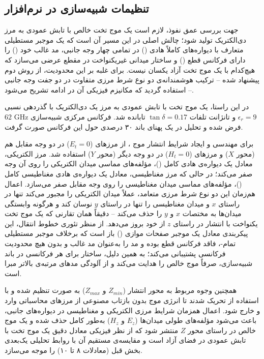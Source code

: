 \documentclass{article}
\begin{document}
	\subsection{تنظیمات شبیه‌سازی در نرم‌افزار }
	جهت بررسی عمق نفوذ، لازم است یک موج تخت  خالص با تابش عمودی به مرز دی‌الکتریک تولید شود؛ چالش اصلی در این مسیر آن است که یک موجبر مستطیلی متعارف با دیواره‌های کاملاً هادی () در تمامی چهار وجه جانبی، مد غالب خود () را دارای فرکانس قطع () و ساختار میدانی غیریکنواخت در مقطع عرضی می‌سازد که هیچ‌کدام با یک موج تخت آزاد یکسان نیست. برای غلبه بر این محدودیت، از روش دوم پیشنهاد شده -- ترکیب هوشمندانه‌ی دو نوع شرط مرزی متفاوت در دو جفت وجه جانبی -- استفاده گردید که مکانیزم فیزیکی آن در ادامه تشریح می‌شود.
	
	در این راستا، یک موج تخت با تابش عمودی به مرز یک دی‌الکتریک با گذردهی نسبی $\epsilon_r = 9$ و تانژانت تلفات $\tan\delta = 0.17$ تابانده شد. فرکانس مرکزی شبیه‌سازی $62 \text{ GHz}$ فرض شده و تحلیل در یک پهنای باند ۳۰ درصدی حول این فرکانس صورت گرفت.
	
	برای مهندسی و ایجاد شرایط انتشار موج ، از مرزهای  ($E_t=0$) در دو وجه مقابل هم (محور $X$) و مرزهای  ($H_t=0$) در دو وجه دیگر (محور $Y$) استفاده شد. مرز الکتریکی، معادل یک دیواره‌ی هادی کامل ()، مؤلفه‌های مماسی میدان الکتریکی را روی آن وجه صفر می‌کند؛ در حالی که مرز مغناطیسی، معادل یک دیواره‌ی هادی مغناطیسی کامل ()، مؤلفه‌های مماسی میدان مغناطیسی را روی وجه مقابل صفر می‌سازد. اعمال هم‌زمان این دو نوع شرط مرزی متعامد، عملاً میدان الکتریکی را مجبور می‌کند تنها در راستای $x$ و میدان مغناطیسی را تنها در راستای $y$ نوسان کند و هرگونه وابستگی میدان‌ها به مختصات $x$ و $y$ را حذف می‌کند -- دقیقاً همان تقارنی که یک موج تخت یکنواخت با انتشار در راستای $z$ از خود بروز می‌دهد. از منظر تئوری خطوط انتقال، این پیکربندی معادل یک موجبر صفحات موازی () باز است که برخلاف موجبر مستطیلی تمام-، فاقد فرکانس قطع بوده و مد  را به‌عنوان مد غالب و بدون هیچ محدودیت فرکانسی پشتیبانی می‌کند؛ به همین دلیل، ساختار برای هر فرکانسی در باند شبیه‌سازی، صرفاً موج  خالص را هدایت می‌کند و از آلودگی مدهای مرتبه‌ی بالاتر مبرا است.
	
	همچنین وجوه مربوط به محور انتشار ($Z_{min}$ و $Z_{max}$) به صورت  تنظیم شده و با استفاده از  تحریک شدند تا انرژی موج بدون بازتاب مصنوعی از مرزهای محاسباتی وارد و خارج شود. اعمال همزمان شرایط مرزی الکتریکی و مغناطیسی در دیواره‌های جانبی، باعث می‌شود مؤلفه‌های طولی میدان‌ها ($E_z$ و $H_z$) به‌طور کامل حذف شده و یک موج  خالص در راستای محور $Z$ منتشر شود که از نظر فیزیکی معادل دقیق یک موج تخت با تابش عمودی در فضای آزاد است و مقایسه‌ی مستقیم آن با روابط تحلیلی یک‌بعدی بخش قبل (معادلات ۸ تا ۱۰) را موجه می‌سازد.
	
\end{document}
